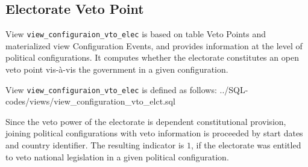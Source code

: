 \subsection{Electorate Veto Point}\label{view_configuration_vto_elec}
View \texttt{view\_configuraion\_vto\_elec} is based on table Veto Points and materialized view Configuration Events, and provides information at the level of political configurations.
It computes whether the electorate constitutes an open veto point vis-\`{a}-vis the government in a given configuration.

View \texttt{view\_configuraion\_vto\_elec} is defined as follows:
%
{../SQL-codes/views/view_configuration_vto_elct.sql}

Since the veto power of the electorate is dependent constitutional provision,
joining political configurations with veto information is proceeded by start dates and country identifier.
The resulting indicator is $1$, if the electorate was entitled to veto national legislation in a given political configuration.


